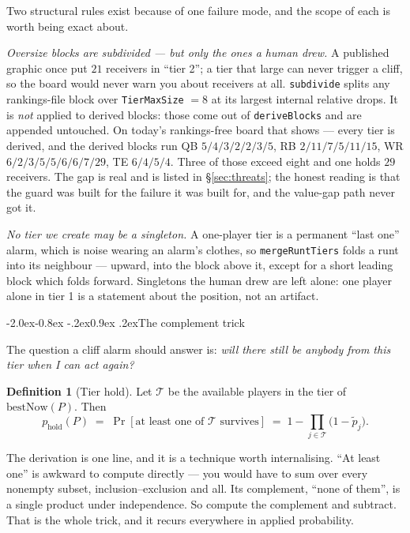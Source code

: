 \documentclass[10pt,a4paper]{article}
\makeatletter
\theoremstyle{plain}
\theoremstyle{definition}
\newtheorem{definition}[theorem]{Definition}
\theoremstyle{remark}
\newcommand{\code}[1]{\texttt{\small #1}}
\renewcommand\subsection{\@startsection{subsection}{2}{\z@}%
  {-2.0ex\@plus -0.8ex \@minus -.2ex}{0.9ex \@plus .2ex}{\normalfont\large\bfseries}}
\makeatother
\begin{document}
Two structural rules exist because of one failure mode, and the scope of each is worth
being exact about.

\emph{Oversize blocks are subdivided --- but only the ones a human drew.} A published
graphic once put $21$ receivers in ``tier 2''; a tier that large can never trigger a
cliff, so the board would never warn you about receivers at all. \code{subdivide} splits
any rankings-file block over \code{TierMaxSize} $= 8$ at its largest internal relative
drops. It is \emph{not} applied to derived blocks: those come out of
\code{deriveBlocks} and are appended untouched. On today's rankings-free board that shows
--- every tier is derived, and the derived blocks run QB $5/4/3/2/2/3/5$, RB
$2/11/7/5/11/15$, WR $6/2/3/5/5/6/6/7/29$, TE $6/4/5/4$. Three of those exceed eight and
one holds $29$ receivers. The gap is real and is listed in \S\ref{sec:threats};
the honest reading is that the guard was built for the failure it was built for, and the
value-gap path never got it.

\emph{No tier \emph{we} create may be a singleton.} A one-player tier is a permanent
``last one'' alarm, which is noise wearing an alarm's clothes, so \code{mergeRuntTiers}
folds a runt into its neighbour --- upward, into the block above it, except for a short
leading block which folds forward. Singletons the human drew are left alone: one player
alone in tier 1 is a statement about the position, not an artifact.

\subsection{The complement trick}

The question a cliff alarm should answer is: \emph{will there still be anybody from this
tier when I can act again?}

\begin{definition}[Tier hold]
Let $\mathcal{T}$ be the available players in the tier of $\mathrm{bestNow}(P)$. Then
\begin{equation}
p_{\mathrm{hold}}(P) \;=\; \Pr[\text{at least one of $\mathcal{T}$ survives}]
\;=\; 1 - \prod_{j\in\mathcal{T}} \big(1 - \tilde p_j\big).
\label{eq:tierhold}
\end{equation}
\end{definition}

The derivation is one line, and it is a technique worth internalising. ``At least one''
is awkward to compute directly --- you would have to sum over every nonempty subset,
inclusion--exclusion and all. Its complement, ``none of them'', is a single product
under independence. So compute the complement and subtract. That is the whole trick, and
it recurs everywhere in applied probability.
\end{document}
